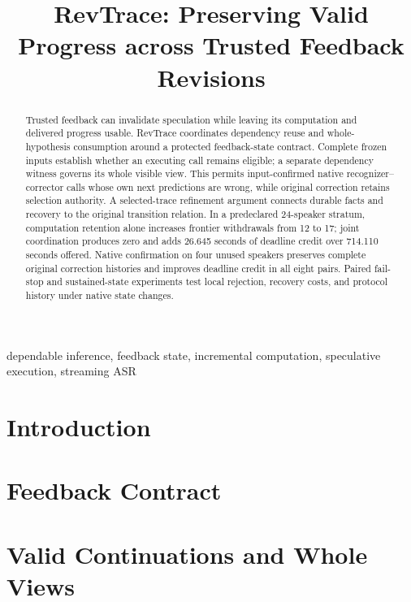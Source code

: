 \documentclass[conference,10pt]{IEEEtran}
\begin{document}
\title{RevTrace: Preserving Valid Progress across Trusted Feedback Revisions}
\author{}
\maketitle
\begin{abstract}
Trusted feedback can invalidate speculation while leaving its computation
and delivered progress usable. RevTrace coordinates dependency reuse and
whole-hypothesis consumption around a protected feedback-state contract.
Complete frozen inputs establish whether an executing call remains
eligible; a separate dependency witness governs its whole visible view.
This permits input-confirmed native recognizer--corrector calls whose own
next predictions are wrong, while original correction retains selection
authority. A selected-trace refinement argument connects durable facts and
recovery to the original transition relation. In a predeclared 24-speaker
stratum, computation retention alone increases frontier withdrawals from
12 to 17; joint coordination produces zero and adds 26.645 seconds of
deadline credit over 714.110 seconds offered. Native confirmation on four
unused speakers preserves complete original correction histories and
improves deadline credit in all eight pairs. Paired fail-stop and
sustained-state experiments test local rejection, recovery costs, and
protocol history under native state changes.
\end{abstract}
\begin{IEEEkeywords}
dependable inference, feedback state, incremental computation, speculative execution, streaming ASR
\end{IEEEkeywords}
\section{Introduction}\label{sec:intro}

\section{Feedback Contract}\label{sec:contract}

\section{Valid Continuations and Whole Views}\label{sec:continuation}



\end{document}
